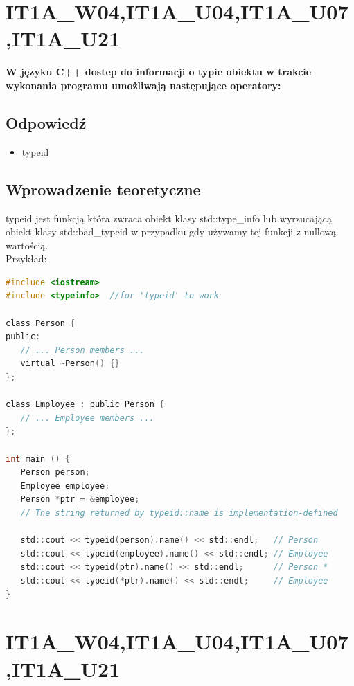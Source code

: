 
\section{IT1A\_W04,IT1A\_U04,IT1A\_U07,IT1A\_U21}
\textbf{W języku C++ dostep do informacji o typie obiektu w trakcie wykonania programu umożliwają następujące operatory:}

\subsection{Odpowiedź}
\begin{itemize}
\item typeid
\end{itemize}

\subsection{Wprowadzenie teoretyczne}
typeid jest funkcją która zwraca obiekt klasy std::type\_info lub wyrzucającą obiekt klasy std::bad\_typeid w przypadku gdy używamy tej funkcji z nullową wartością.\\
Przykład:
\begin{lstlisting}[language=c]
#include <iostream>
#include <typeinfo>  //for 'typeid' to work

class Person {
public:
   // ... Person members ...
   virtual ~Person() {}
};

class Employee : public Person {
   // ... Employee members ...
};

int main () {
   Person person;
   Employee employee;
   Person *ptr = &employee;
   // The string returned by typeid::name is implementation-defined
   
   std::cout << typeid(person).name() << std::endl;   // Person
   std::cout << typeid(employee).name() << std::endl; // Employee
   std::cout << typeid(ptr).name() << std::endl;      // Person * 
   std::cout << typeid(*ptr).name() << std::endl;     // Employee
}
\end{lstlisting}


\section{IT1A\_W04,IT1A\_U04,IT1A\_U07,IT1A\_U21}
